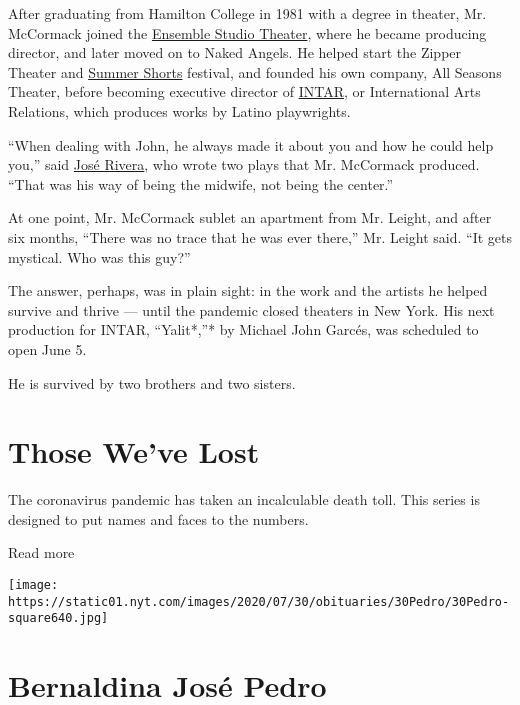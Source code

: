 After graduating from Hamilton College in 1981 with a degree in theater,
Mr. McCormack joined the
\href{https://www.ensemblestudiotheatre.org/}{Ensemble Studio Theater},
where he became producing director, and later moved on to Naked Angels.
He helped start the Zipper Theater and
\href{https://www.summershortsfestival.com/}{Summer Shorts} festival,
and founded his own company, All Seasons Theater, before becoming
executive director of \href{https://www.intartheatre.org/}{INTAR}, or
International Arts Relations, which produces works by Latino
playwrights.

``When dealing with John, he always made it about you and how he could
help you,'' said
\href{https://www.nytimes.com/2006/02/26/theater/newsandfeatures/jose-rivera.html}{José
Rivera}, who wrote two plays that Mr. McCormack produced. ``That was his
way of being the midwife, not being the center.''

At one point, Mr. McCormack sublet an apartment from Mr. Leight, and
after six months, ``There was no trace that he was ever there,'' Mr.
Leight said. ``It gets mystical. Who was this guy?''

The answer, perhaps, was in plain sight: in the work and the artists he
helped survive and thrive --- until the pandemic closed theaters in New
York. His next production for INTAR, ``Yalit*,''* by Michael John
Garcés, was scheduled to open June 5.

He is survived by two brothers and two sisters.

\href{https://www.nytimes.com/interactive/2020/obituaries/people-died-coronavirus-obituaries.html?action=click\&pgtype=Article\&state=default\&region=BELOW_MAIN_CONTENT\&context=covid_obits_promo}{}

\hypertarget{those-weve-lost}{%
\section{Those We've Lost}\label{those-weve-lost}}

The coronavirus pandemic has taken an incalculable death toll. This
series is designed to put names and faces to the numbers.

Read more

\texttt{[image: https://static01.nyt.com/images/2020/07/30/obituaries/30Pedro/30Pedro-square640.jpg]}

\hypertarget{bernaldina-josuxe9-pedro}{%
\section{Bernaldina José Pedro}\label{bernaldina-josuxe9-pedro}}


